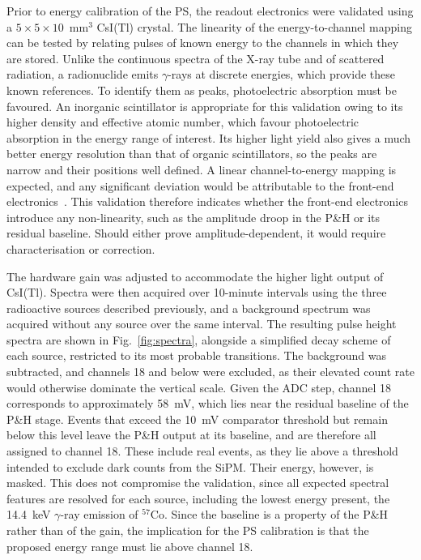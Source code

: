 Prior to energy calibration of the PS, the readout electronics were validated using a $5 \times 5 \times 10$~mm$^3$ CsI(Tl) crystal. The linearity of the energy-to-channel mapping can be tested by relating pulses of known energy to the channels in which they are stored. Unlike the continuous spectra of the X-ray tube and of scattered radiation, a radionuclide emits $\gamma$-rays at discrete energies, which provide these known references. To identify them as peaks, photoelectric absorption must be favoured. An inorganic scintillator is appropriate for this validation owing to its higher density and effective atomic number, which favour photoelectric absorption in the energy range of interest. Its higher light yield also gives a much better energy resolution than that of organic scintillators, so the peaks are narrow and their positions well defined. A linear channel-to-energy mapping is expected, and any significant deviation would be attributable to the front-end electronics~\cite{14}. This validation therefore indicates whether the front-end electronics introduce any non-linearity, such as the amplitude droop in the P\&H or its residual baseline. Should either prove amplitude-dependent, it would require characterisation or correction.

The hardware gain was adjusted to accommodate the higher light output of CsI(Tl). Spectra were then acquired over 10-minute intervals using the three radioactive sources described previously, and a background spectrum was acquired without any source over the same interval. The resulting pulse height spectra are shown in Fig.~\ref{fig:spectra}, alongside a simplified decay scheme of each source, restricted to its most probable transitions.
The background was subtracted, and channels 18 and below were excluded, as their elevated count rate would otherwise dominate the vertical scale. Given the ADC step, channel 18 corresponds to approximately 58~mV, which lies near the residual baseline of the P\&H stage. Events that exceed the 10~mV comparator threshold but remain below this level leave the P\&H output at its baseline, and are therefore all assigned to channel 18. These include real events, as they lie above a threshold intended to exclude dark counts from the SiPM. Their energy, however, is masked. This does not compromise the validation, since all expected spectral features are resolved for each source, including the lowest energy present, the 14.4~keV $\gamma$-ray emission of $^{57}$Co. Since the baseline is a property of the P\&H rather than of the gain, the implication for the PS calibration is that the proposed energy range must lie above channel 18.

